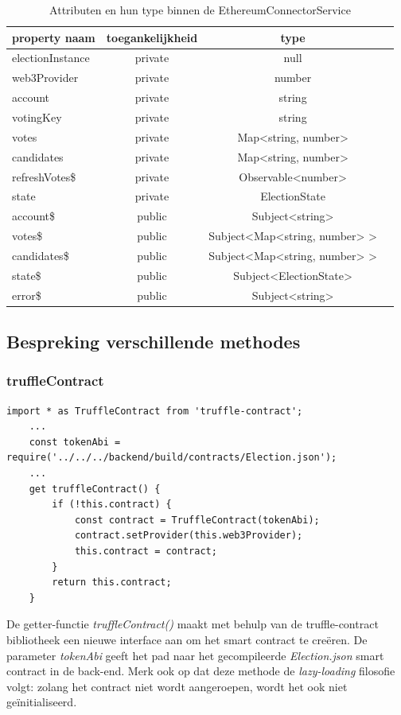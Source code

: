 	\begin{table}
		\centering
		\begin{tabular}{ |l|c|c|c| } 
			\hline
			\textbf{property naam} & \textbf{toegankelijkheid}&  \textbf{type}  \\
			\hline
			electionInstance 		& private & null \\ 
			web3Provider 			& private & number\\ 
			account 					  & private & string \\ 
			votingKey 					& private & string \\ 
			votes 							 & private & Map<string, number> \\ 
			candidates 					& private & Map<string, number>  \\ 
			refreshVotes\$ 			 & private & Observable<number>  \\ 
			state 							  & private & ElectionState  \\ 
			account\$  					& public & Subject<string> \\ 
			votes\$  					   & public & Subject<Map<string, number> > \\ 
			candidates\$ 			 & public & Subject<Map<string, number> > \\ 
			state\$ 						& public & Subject<ElectionState>  \\ 
			error\$ 						& public & Subject<string> \\ 
			\hline
		\end{tabular}
	\caption{Attributen en hun type binnen de EthereumConnectorService}
	\label{tab:ethservice}
\end{table}
\newpage
\subsection{Bespreking verschillende methodes}
	\subsubsection{truffleContract}
	\lstset{language=JavaScriptSolidity} 
	\begin{lstlisting}[numbers=none]
	import * as TruffleContract from 'truffle-contract';
	...
	const tokenAbi = require('../../../backend/build/contracts/Election.json');
	...
	get truffleContract() {
		if (!this.contract) {
			const contract = TruffleContract(tokenAbi);
			contract.setProvider(this.web3Provider);
			this.contract = contract;
		}
		return this.contract;
	}
	\end{lstlisting}
	De getter-functie \textit{truffleContract()} maakt met behulp van de  truffle-contract bibliotheek een nieuwe interface aan om het smart contract te creëren. De parameter \textit{tokenAbi} geeft het pad naar het gecompileerde \textit{Election.json} smart contract in de back-end. Merk ook op dat deze methode de \textit{lazy-loading} filosofie volgt: zolang het contract niet wordt aangeroepen, wordt het ook niet geïnitialiseerd.
